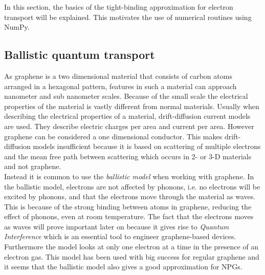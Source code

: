 In this section, the basics of the tight-binding approximation for electron transport will be explained. This motivates the use of numerical routines using NumPy.
\subsection{Ballistic quantum transport}
As graphene is a two dimensional material that consists of carbon atoms arranged in a hexagonal pattern, features in such a material can approach nanometer and sub nanometer scales. Because of the small scale the electrical properties of the material is vastly different from normal materials. Usually when describing the electrical properties of a material, drift-diffusion current models are used. They describe electric charges per area and current per area. However graphene can be considered a one dimensional conductor. This makes drift-diffusion models insufficient because it is based on scattering of multiple electrons and the mean free path between scattering which occurs in 2- or 3-D materials and not graphene. \\
Instead it is common to use the \textit{ballistic model} when working with graphene. In the ballistic model, electrons are not affected by phonons, i.e. no electrons will be excited by phonons, and that the electrons move through the material as waves. This is because of the strong binding between atoms in graphene, reducing the effect of phonons, even at room temperature. The fact that the electrons moves as waves will prove important later on because it gives rise to \textit{Quantum Interference} which is an essential tool to engineer graphene-based devices. Furthermore the model looks at only one electron at a time in the presence of an electron gas. This model has been used with big success for regular graphene and it seems that the ballistic model also gives a good approximation for NPGs.
